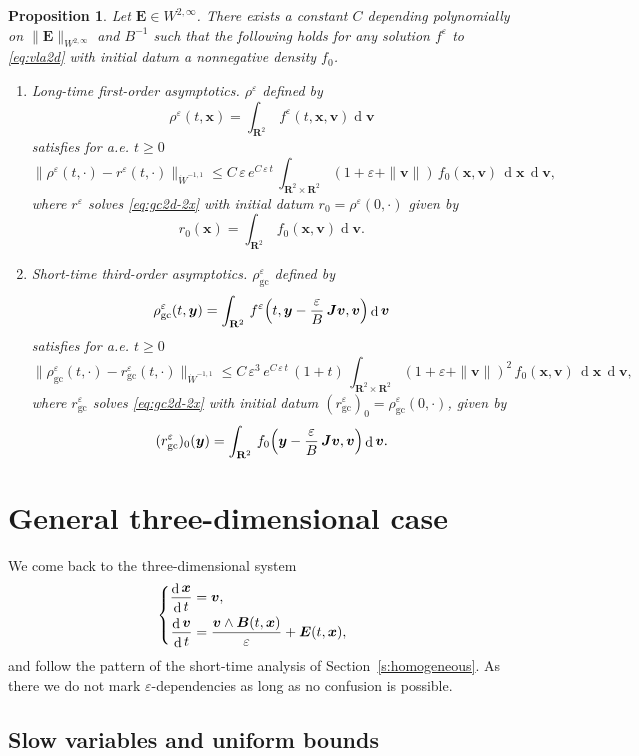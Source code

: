 \documentclass[10pt]{amsart}
\newenvironment{enumeratei}
{\bgroup\def\theenumi{\roman{enumi}}\def\theenumii{\arabic{enumii}}\begin{enumerate}}
{\end{enumerate}\egroup}
\newenvironment{splitcases}
{\begin{cases}\begin{aligned}}
{\end{aligned}\end{cases}}
\let\eps\varepsilon
\DeclareMathOperator\dD{d}\let\dd\dD
\theoremstyle{plain}
\newtheorem{proposition}[theorem]{Proposition}
\theoremstyle{definition}
\newcommand{\be}{\begin{equation}}
\newcommand{\ee}{\end{equation}}
\newcommand{\bpr}{\begin{proposition}}
\newcommand{\epr}{\end{proposition}}
\newcommand\R{\mathbf R}
\newcommand\bB{{\boldsymbol B}}
\newcommand\bE{{\boldsymbol E}}
\newcommand\bJ{{\boldsymbol J}}
\newcommand\bfv{{\boldsymbol v}}
\newcommand\bfx{{\boldsymbol x}}
\newcommand\bfy{{\boldsymbol y}}
\begin{document}
\bpr
Let $\bE\in W^{2,\infty}$. There exists a constant $C$ depending polynomially on $\|\bE\|_{W^{2,\infty}}$ and $B^{-1}$ such that the following holds for any solution $f^\eps$ to \eqref{eq:vla2d} with initial datum a nonnegative density $f_0$.
\begin{enumeratei}
\item
\emph{Long-time first-order asymptotics}. $\rho^\eps$ defined by
\[
\rho^\eps(t,\bfx)=\int_{\R^2}\,f^\eps(t,\bfx,\bfv)\dD \bfv
\]
satisfies for a.e. $t\geq0$
\[
\|\rho^\eps(t,\cdot)-r^\eps(t,\cdot)\|_{\dot{W}^{-1,1}}\leq C\,\eps\,e^{C\,\eps\,t}\,\int_{\R^2\times\R^2}(1+\eps+\|\bfv\|)\,f_0(\bfx,\bfv)\,\dD\bfx\,\dD\bfv,
\]
where $r^\eps$ solves \eqref{eq:gc2d-2x} with initial datum $r_0=\rho^\eps(0,\cdot)$ given by
\[
r_0(\bfx)=\int_{\R^2}\,f_0(\bfx,\bfv)\dD \bfv.
\]

\item
\emph{Short-time third-order asymptotics}. $\rho_\mathrm{gc}^\eps$ defined by
\[
\rho_\mathrm{gc}^\eps(t,\bfy)=\int_{\R^2}\,f^\eps\Bigl(t,\bfy-\frac{\eps}{B}\,\bJ\bfv,\bfv\Bigr)\dD\bfv
\]
satisfies for a.e. $t\geq0$
\[
\|\rho_\mathrm{gc}^\eps(t,\cdot)-r_\mathrm{gc}^\eps(t,\cdot)\|_{\dot{W}^{-1,1}}\leq C\,\eps^3\,e^{C\,\eps\,t}\,(1+t)\,\int_{\R^2\times\R^2}(1+\eps+\|\bfv\|)^2\,f_0(\bfx,\bfv)\,\dD\bfx\,\dD\bfv,
\]
where $r_\mathrm{gc}^\eps$ solves \eqref{eq:gc2d-2x} with initial datum $(r_\mathrm{gc}^\eps)_0=\rho_\mathrm{gc}^\eps(0,\cdot)$, given by
\[
(r_\mathrm{gc}^\eps)_0(\bfy)=\int_{\R^2}\,f_0\Bigl(\bfy-\frac{\eps}{B}\,\bJ\bfv,\bfv\Bigr)\dD\bfv.
\]
\end{enumeratei}
\epr

\section{General three-dimensional case}\label{s:general}

We come back to the three-dimensional system
\be
\label{e:xv}
\begin{splitcases}
\frac{\dD\bfx}{\dD t}&=\bfv,
\\
\frac{\dD\bfv}{\dD t}&=\frac{\bfv\wedge \bB(t,\bfx)}{\eps} +\bE(t,\bfx),
\end{splitcases}
\ee
and follow the pattern of the short-time analysis of Section~\ref{s:homogeneous}. As there we do not mark $\eps$-dependencies as long as no confusion is possible.

\subsection{Slow variables and uniform bounds}
\end{document}
